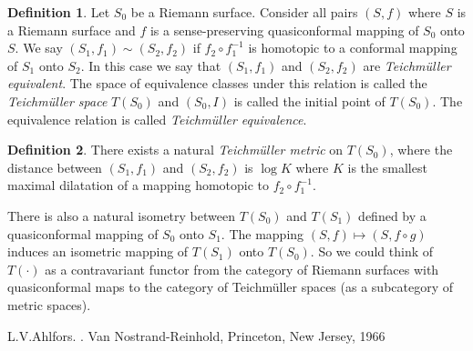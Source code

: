\documentclass[12pt]{article}
\theoremstyle{theorem}
\theoremstyle{definition}
\newtheorem*{defn}{Definition}
\theoremstyle{remark}
\begin{document}
\begin{defn}
Let $S_0$ be a Riemann surface.  Consider all pairs $(S,f)$ where
$S$ is a Riemann surface and $f$ is a sense-preserving quasiconformal
mapping of $S_0$ onto $S$.  We say $(S_1,f_1) \sim (S_2,f_2)$ if $f_2 \circ
f_1^{-1}$ is homotopic to a conformal mapping of $S_1$ onto $S_2$.  In this case we say that $(S_1,f_1)$ and $(S_2,f_2)$ are {\em Teichm\"uller equivalent}.  The space of equivalence classes under this relation is called the {\em Teichm\"uller space} $T(S_0)$ and $(S_0,I)$ is called the initial
point of $T(S_0)$.  The equivalence relation is called {\em Teichm\"uller equivalence}.
\end{defn}

\begin{defn}
There exists a natural {\em Teichm\"uller metric} on $T(S_0)$, where the distance
between $(S_1,f_1)$ and $(S_2,f_2)$ is $\log K$ where $K$ is the smallest maximal dilatation of a mapping homotopic to $f_2 \circ f_1^{-1}$.
\end{defn}

There is also a natural isometry between $T(S_0)$ and $T(S_1)$ defined by
a quasiconformal mapping of $S_0$ onto $S_1$.  The mapping
$(S,f) \mapsto (S,f \circ g)$ induces an isometric mapping of $T(S_1)$ onto $T(S_0)$.  So we could think of $T(\cdot)$ as a contravariant functor from
the category of Riemann surfaces with quasiconformal maps to the category of
Teichm\"uller spaces (as a subcategory of metric spaces).

\begin{thebibliography}{9}
L.\@ V.\@ Ahlfors.  \emph{}.  Van Nostrand-Reinhold, Princeton, New Jersey, 1966
\end{thebibliography}
\end{document}
